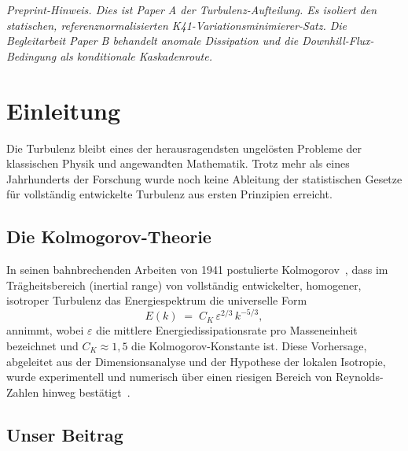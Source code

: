 \documentclass[12pt,a4paper]{article}
\theoremstyle{definition}
\theoremstyle{plain}
\theoremstyle{remark}
\begin{document}
\begin{center}
\small\emph{Preprint-Hinweis. Dies ist Paper A der Turbulenz-Aufteilung. Es isoliert den statischen, referenznormalisierten K41-Variationsminimierer-Satz. Die Begleitarbeit Paper B behandelt anomale Dissipation und die Downhill-Flux-Bedingung als konditionale Kaskadenroute.}
\end{center}
\clearpage

\tableofcontents
\clearpage

\section{Einleitung}\label{sec:intro}

Die Turbulenz bleibt eines der herausragendsten ungelösten Probleme der klassischen
Physik und angewandten Mathematik. Trotz mehr als eines Jahrhunderts der Forschung
wurde noch keine Ableitung der statistischen Gesetze für vollständig entwickelte Turbulenz 
aus ersten Prinzipien erreicht.

\subsection{Die Kolmogorov-Theorie}

In seinen bahnbrechenden Arbeiten von 1941 postulierte Kolmogorov~\cite{K41a,K41b}, dass
im Trägheitsbereich (inertial range) von vollständig entwickelter, homogener, isotroper
Turbulenz das Energiespektrum die universelle Form
\begin{equation}\label{eq:K41}
  E(k) \;=\; C_K \,\varepsilon^{2/3}\, k^{-5/3},
\end{equation}
annimmt, wobei $\varepsilon$ die mittlere Energiedissipationsrate pro
Masseneinheit bezeichnet und $C_K \approx 1{,}5$ die Kolmogorov-Konstante ist. Diese Vorhersage,
abgeleitet aus der Dimensionsanalyse und der Hypothese der lokalen Isotropie,
wurde experimentell und numerisch über einen riesigen Bereich von
Reynolds-Zahlen hinweg bestätigt~\cite{Frisch95,Pope00}.

\subsection{Unser Beitrag}
\end{document}
